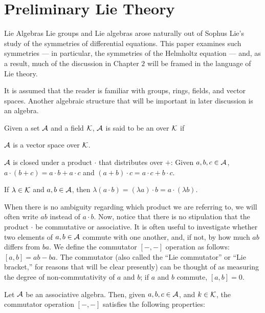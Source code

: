 \chapter{Preliminary Lie Theory}

\begin{section}{Lie Algebras}
Lie groups and Lie algebras arose naturally out of Sophus Lie's study of the symmetries of differential equations.  This paper examines such symmetries --- in particular, the symmetries of the Helmholtz equation --- and, as a result, much of the discussion in Chapter $2$ will be framed in the language of Lie theory.

It is assumed that the reader is familiar with groups, rings, fields, and vector spaces.  Another algebraic structure that will be important in later discussion is an algebra.

\begin{definition}
\label{alg}
Given a set $\mathcal{A}$ and a field $\mathcal{K}$, $\mathcal{A}$ is said to be an  over $\mathcal{K}$ if

\noindent {}  $\mathcal{A}$ is a vector space over $\mathcal{K}$.

\noindent {}  $\mathcal{A}$ is closed under a product $\cdot$ that distributes over $+$: Given $a, b, c \in \mathcal{A}$, $a \cdot (b + c) = a \cdot b + a \cdot c$ and $(a + b) \cdot c = a \cdot c + b \cdot c$.

\noindent {}  If $\lambda \in \mathcal{K}$ and $a,b \in \mathcal{A}$, then $\lambda (a \cdot b) = (\lambda a) \cdot b = a \cdot (\lambda b)$.
\end{definition}

When there is no ambiguity regarding which product we are referring to, we will often write $ab$ instead of $a \cdot b$.  Now, notice that there is no stipulation that the product $\cdot$ be commutative or associative.  It is often useful to investigate whether two elements of $a, b \in \mathcal{A}$ commute with one another, and, if not, by how much $ab$ differs from $ba$.  We define the commutator $[-,-]$ operation as follows: $[a,b] = ab - ba$.  The commutator (also called the ``Lie commutator'' or ``Lie bracket,'' for reasons that will be clear presently) can be thought of as measuring the degree of non-commutativity of $a$ and $b$; if $a$ and $b$ commute, $[a,b] = 0$.

\begin{theorem}
\label{bracket}
Let $\mathcal{A}$ be an associative algebra.  Then, given $a,b,c \in \mathcal{A}$, and $k \in \mathcal{K}$, the commutator operation $[-,-]$ satisfies the following properties:


\end{theorem}
\end{section}
